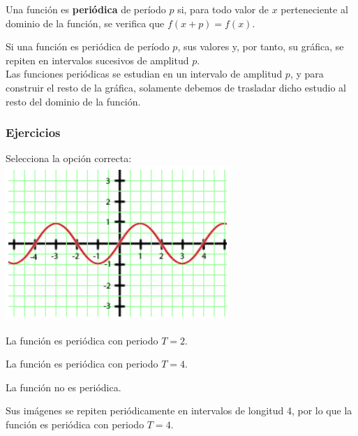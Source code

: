 
\begin{definition}
Una función es \textbf{periódica} de período $p$ si, para todo valor de $x$ perteneciente al dominio de la función, se verifica que $f(x+p)=f(x)$.
\end{definition}
Si una función es periódica de período $p$, sus valores y, por tanto, su gráfica, se repiten en intervalos sucesivos de amplitud $p$.\\
Las funciones periódicas se estudian en un intervalo de amplitud $p$, y para construir el resto de la gráfica, solamente debemos de trasladar dicho estudio al resto del dominio de la función.
\subsubsection{Ejercicios}
Selecciona la opción correcta:\\
\includegraphics{samples/propiedades/periodicidad1.jpg}
\begin{scq}
	\begin{choices}
		\begin{choice}
			La función es periódica con periodo $T=2$.	
		\end{choice}
		\begin{choice}[x]
			La función es periódica con periodo $T=4$.
		\end{choice}	
		\begin{choice}
			La función no es periódica.
		\end{choice}
	\end{choices}
	\begin{feedback}
		Sus imágenes se repiten periódicamente en intervalos de longitud 4, por lo que la función es periódica con periodo $T=4$.
	\end{feedback}
\end{scq}

\vspace{1cm}

